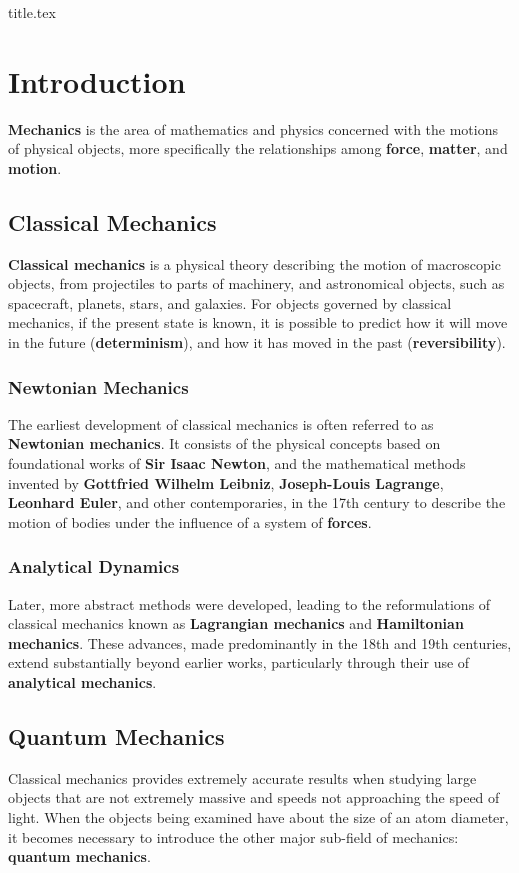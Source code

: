\documentclass[a4paper, 12pt]{book}
\begin{document}
\frontmatter
{title.tex}

\clearpage
\thispagestyle{empty}

\tableofcontents

\mainmatter
\chapter{Introduction}
\textbf{Mechanics} is the area of mathematics and physics concerned with the motions of physical objects, more specifically the relationships among \textbf{force}, \textbf{matter}, and \textbf{motion}.

\section{Classical Mechanics}	
\textbf{Classical mechanics}  is a physical theory describing the motion of macroscopic objects, from projectiles to parts of machinery, and astronomical objects, such as spacecraft, planets, stars, and galaxies. For objects governed by classical mechanics, if the present state is known, it is possible to predict how it will move in the future (\textbf{determinism}), and how it has moved in the past (\textbf{reversibility}).
\subsection{Newtonian Mechanics}
The earliest development of classical mechanics is often referred to as \textbf{Newtonian mechanics}. It consists of the physical concepts based on foundational works of \textbf{Sir Isaac Newton}, and the mathematical methods invented by \textbf{Gottfried Wilhelm Leibniz}, \textbf{Joseph-Louis Lagrange}, \textbf{Leonhard Euler}, and other contemporaries, in the 17th century to describe the motion of bodies under the influence of a system of \textbf{forces}.
\subsection{Analytical Dynamics}
Later, more abstract methods were developed, leading to the reformulations of classical mechanics known as \textbf{Lagrangian mechanics} and \textbf{Hamiltonian mechanics}. These advances, made predominantly in the 18th and 19th centuries, extend substantially beyond earlier works, particularly through their use of \textbf{analytical mechanics}.
\section{Quantum Mechanics}
Classical mechanics provides extremely accurate results when studying large objects that are not extremely massive and speeds not approaching the speed of light. When the objects being examined have about the size of an atom diameter, it becomes necessary to introduce the other major sub-field of mechanics: \textbf{quantum mechanics}.
\end{document}
